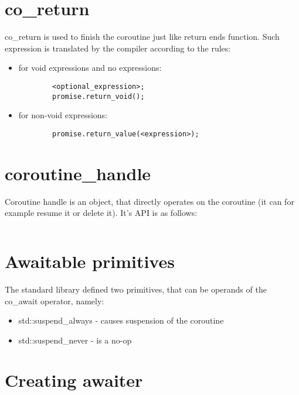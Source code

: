 \documentclass[twoside,twocolumn, 10pt]{article}
\begin{document}
\pagebreak[0]
\section{co\_return}
	co\_return is used to finish the coroutine just like return ends function. 
	Such expression is translated by the compiler according to the rules:

	\begin{itemize}
		\item for void expressions and no expressions:
		\begin{verbatim}
		<optional_expression>;
		promise.return_void();
		\end{verbatim}

		\item for non-void expressions:

		\begin{verbatim}
		promise.return_value(<expression>);
	\end{verbatim}
	
	\end{itemize}
		

  \pagebreak[0]
  \section{coroutine\_handle}

	Coroutine handle is an object, that directly operates on the coroutine
	(it can for example resume it or delete it). It's API is as follows:

	\inputminted{c++}{code-examples/theory-custom-coroutine/coroutine-handle.hpp}

	\pagebreak[0]
	\section{Awaitable primitives}

	The standard library defined two primitives, that can be
	operands of the co\_await operator, namely:
	\begin{itemize}
		\item std::suspend\_always - causes suspension of the coroutine
		\item std::suspend\_never - is a no-op
	\end{itemize}

  \pagebreak[0]
	\section{Creating awaiter}
\end{document}

